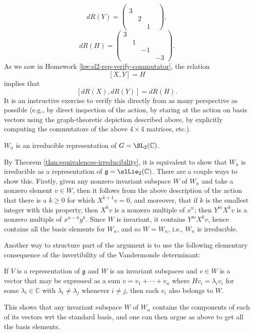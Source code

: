 \documentclass[reqno]{amsart} 
\begin{document}
\begin{equation*}
  d R(Y)
  = 
\begin{pmatrix}
    &  & & \\
    3 &  &  & \\
    & 2 &  & \\
    & & 1 &
  \end{pmatrix}
,
\end{equation*}
\begin{equation*}
  d R(H)
  = 
\begin{pmatrix}
    3 &  & & \\
    &  1 &  & \\
    &  & -1  & \\
    & &  & -3
  \end{pmatrix}
.
\end{equation*}
As we saw in Homework \ref{hw:sl2-rep-verify-commutator},
the relation
\begin{equation*}
  {}  [X,Y] = H
\end{equation*}
implies
that
\begin{equation*}
  {}  [d R(X), d R(Y)] = d R(H).
\end{equation*}
It is an instructive exercise
to verify this directly
from as many perspective as possible
(e.g., by direct inspection of the action,
by staring at the action on basis vectors using the
graph-theoretic
depiction described above,
by explicitly computing the commutators of the above $4 \times
4$ matrices, etc.).

\begin{theorem}
  $W_n$ is an irreducible representation of $G = \SL_2(\mathbb{C})$.
\end{theorem}
By Theorem \ref{thm:equivalences-irreducibility},
it is equivalent to show that $W_n$ is irreducible
as a representation of $\mathfrak{g} = \slLie_2(\mathbb{C})$.
There are a couple ways to show this.
Firstly, given any nonzero invariant
subspace $W$ of $W_n$
and take a nonzero element $v \in W$,
then it follows from the above description
of the action that
there is a $k \geq 0$
for which $X^{k+1} v = 0$,
and moreover, that if $k$ is the smallest integer
with this property, then $X^k v$ is a nonzero
multiple of $x^n$;
then $Y^m X^k v$ is a nonzero
multiple of $x^{n-k} y^k$.
Since $W$ is invariant, it contains
$Y^m X^k v$,
hence contains all the basis elements for $W_n$,
and so $W = W_n$, i.e., $W_n$ is irreducible.

Another way to structure part of the argument is to use the
following
elementary consequence of the invertibility of the Vandermonde
determinant:
\begin{lemma}
 If $V$ is a representation of $\mathfrak{g}$
  and $W$ is an invariant subspaces
  and $v \in W$ is a vector that may be expressed
  as a sum $v = v_1 + \dotsb + v_n$
  where $H v_i = \lambda_i v_i$
  for some $\lambda_i \in \mathbb{C}$
  with $\lambda_i \neq \lambda_j$ whenever $i \neq j$,
  then
  each $v_i$ also belongs to $W$.
\end{lemma}
This shows that any invariant subspace
$W$ of $W_n$
contains the components
of each of its vectors wrt the standard basis,
and one can then argue as above to get all the basis elements.
\end{document}
